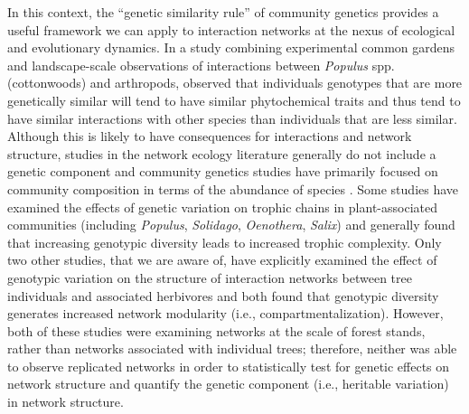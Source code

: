 \documentclass[fleqn,12pt]{olplainarticle}
\begin{document}
In this context, the ``genetic similarity rule'' of community genetics
provides a useful framework we can apply to interaction networks at
the nexus of ecological and evolutionary dynamics. In a study
combining experimental common gardens and landscape-scale observations
of interactions between \textit{Populus} spp.  (cottonwoods) and
arthropods, \cite{Bangert2006} observed that individuals genotypes
that are more genetically similar will tend to have similar
phytochemical traits and thus tend to have similar interactions with
other species than individuals that are less similar. Although this is
likely to have consequences for interactions and network structure,
studies in the network ecology literature generally do not include a
genetic component \citep{Lau2017a} and community genetics studies have
primarily focused on community composition in terms of the abundance
of species \citep{DesRoches2018TheVariation}. Some studies have
examined the effects of genetic variation on trophic chains in
plant-associated communities (including \textit{Populus},
\textit{Solidago}, \textit{Oenothera}, \textit{Salix})
\citep{Bailey2005ImportanceInteractions, Johnson2008, Smith2011,
  Smith2015b, Barbour2016GeneticComplexity} and generally found that
increasing genotypic diversity leads to increased trophic
complexity. Only two other studies, that we are aware of, have
explicitly examined the effect of genotypic variation on the structure
of interaction networks between tree individuals and associated
herbivores \citep{Lau2015a, Keith2017} and both found that genotypic
diversity generates increased network modularity (i.e.,
compartmentalization).  However, both of these studies were examining
networks at the scale of forest stands, rather than networks
associated with individual trees; therefore, neither was able to
observe replicated networks in order to statistically test for genetic
effects on network structure and quantify the genetic component
(i.e., heritable variation) in network structure.
\end{document}
